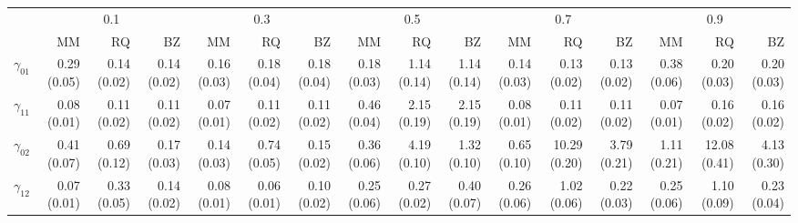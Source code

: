 \documentclass[12pt]{article}
\begin{document}
\begin{landscape}
\begin{table}[h]
\begin{tabular}{rrrrrrrrrrrrrrrr}
      \cline{2-16}
      &  \multicolumn{3}{c}{0.1} &  \multicolumn{3}{c}{0.3} &  \multicolumn{3}{c}{0.5} &
      \multicolumn{3}{c}{0.7} &  \multicolumn{3}{c}{0.9} \\
      \cline{2-16}
      & MM   & RQ   & BZ   & MM   & RQ   & BZ   & MM   & RQ   & BZ   & MM   & RQ   & BZ   & MM   & RQ   & BZ   \\
      \hline
      $\gamma_{01}$ &0.29 (0.05) & 0.14 (0.02) & 0.14 (0.02) & 0.16 (0.03) & 0.18 (0.04) & 0.18 (0.04) & 0.18 (0.03) & 1.14 (0.14) & 1.14 (0.14) & 0.14 (0.03) & 0.13 (0.02) & 0.13 (0.02) & 0.38 (0.06) & 0.20 (0.03) & 0.20 (0.03) \\
      $\gamma_{11}$ &0.08 (0.01) & 0.11 (0.02) & 0.11 (0.02) & 0.07 (0.01) & 0.11 (0.02) & 0.11 (0.02) & 0.46 (0.04) & 2.15 (0.19) & 2.15 (0.19) & 0.08 (0.01) & 0.11 (0.02) & 0.11 (0.02) & 0.07 (0.01) & 0.16 (0.02) & 0.16 (0.02) \\
      $\gamma_{02}$ &0.41 (0.07) & 0.69 (0.12) & 0.17 (0.03) & 0.14 (0.03) & 0.74 (0.05) & 0.15 (0.02) & 0.36 (0.06) & 4.19 (0.10) & 1.32 (0.10) & 0.65 (0.10) & 10.29 (0.20) & 3.79 (0.21) & 1.11 (0.21) & 12.08 (0.41) & 4.13 (0.30) \\
      $\gamma_{12}$ &0.07 (0.01) & 0.33 (0.05) & 0.14 (0.02) & 0.08 (0.01) & 0.06 (0.01) & 0.10 (0.02) & 0.25 (0.06) & 0.27 (0.02) & 0.40 (0.07) & 0.26 (0.06) & 1.02 (0.06) & 0.22 (0.03) & 0.25 (0.06) & 1.10 (0.09) & 0.23 (0.04) \\
      \bottomrule
    \end{tabular}


\end{table}
\end{landscape}
\end{document}
